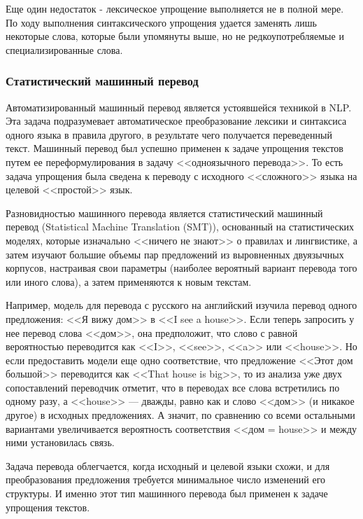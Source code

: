 Еще один недостаток -  лексическое упрощение выполняется не в полной мере. По ходу выполнения синтаксического упрощения удается заменять лишь некоторые слова, которые были упомянуты выше, но не редкоупотребляемые и специализированные слова.


\subsubsection{Статистический машинный перевод}
Автоматизированный машинный перевод является устоявшейся техникой в NLP. Эта задача подразумевает автоматическое преобразование лексики и синтаксиса одного языка в правила другого, в результате чего получается переведенный текст. Машинный перевод был успешно применен\cite{shardlow_survey_2014} к задаче упрощения текстов путем ее переформулирования в задачу <<одноязычного перевода>>. То есть задача упрощения была сведена к переводу с исходного <<сложного>> языка на целевой <<простой>> язык.

Разновидностью машинного перевода является статистический машинный перевод (Statistical Machine Translation (SMT)), основанный на статистических моделях, которые изначально <<ничего не знают>> о правилах и лингвистике, а затем изучают большие объемы пар предложений из выровненных двуязычных корпусов, настраивая свои параметры (наиболее вероятный вариант перевода того или иного слова), а затем применяются к новым текстам. 

Например, модель для перевода с русского на английский изучила перевод одного предложения: <<Я вижу дом>> в <<I see a house>>. Если теперь запросить у нее перевод слова <<дом>>, она предположит, что слово с равной вероятностью переводится как <<I>>, <<see>>, <<a>> или <<house>>. Но если предоставить модели еще одно соответствие, что предложение <<Этот дом большой>> переводится как <<That house is big>>, то из анализа уже двух сопоставлений переводчик отметит, что в переводах все слова встретились по одному разу, а <<house>> — дважды, равно как и слово <<дом>> (и никакое другое) в исходных предложениях. А значит, по сравнению со всеми остальными вариантами увеличивается вероятность соответствия <<дом = house>> и между ними установилась связь. 

Задача перевода облегчается, когда исходный и целевой языки схожи, и для преобразования предложения требуется минимальное число изменений его структуры. И именно этот тип машинного перевода был применен к задаче упрощения текстов\cite{shardlow_survey_2014}.




